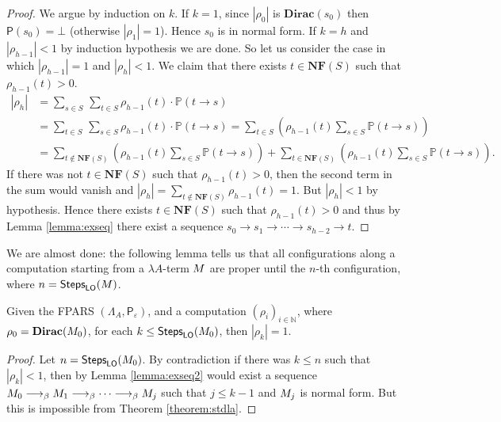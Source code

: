 \begin{proof}
	We argue by induction on $k$. If $k=1$, since $|\rho_0|$ is $\mathbf{Dirac}(s_0)$ then $\mathsf{P}(s_0)=\bot$ (otherwise $|\rho_1|=1$). Hence $s_0$ is in normal form. If $k=h$ and $|\rho_{h-1}|<1$ by induction hypothesis we are done. So let us consider the case in which $|\rho_{h-1}|=1$ and $|\rho_h|<1$. We claim that there exists $t\in \mathbf{NF}(S)$ such that $\rho_{h-1}(t)>0$.
	\begin{align*}
	|\rho_h|&=\underset{s\in S}{\sum}\,\underset{t\in S}{\sum}\rho_{h-1}(t) \cdot\mathbb{P}\left(t \rightarrow s\right)\\
	&=\underset{t\in S}{\sum}\,\underset{s\in S}{\sum}\rho_{h-1}(t) \cdot\mathbb{P}\left(t \rightarrow s\right)=\underset{t\in S}{\sum}\left(\rho_{h-1}(t)\underset{s\in S}{\sum}\mathbb{P}\left(t \rightarrow s\right) \right)\\
	&=\underset{t\not\in \mathbf{NF}(S)}{\sum}\left(\rho_{h-1}(t)\underset{s\in S}{\sum}\mathbb{P}\left(t \rightarrow s\right) \right)+\underset{t\in \mathbf{NF}(S)}{\sum}\left(\rho_{h-1}(t)\underset{s\in S}{\sum}\mathbb{P}\left(t \rightarrow s\right) \right).
	\end{align*}
	If there was not $t\in \mathbf{NF}(S)$ such that $\rho_{h-1}(t)>0$, then the second term in the sum would vanish and
	$|\rho_h|=\underset{t\not\in \mathbf{NF}(S)}{\sum}\rho_{h-1}(t)=1$.
	But $|\rho_h|<1$ by hypothesis. Hence there exists $t\in \mathbf{NF}(S)$ such that $\rho_{h-1}(t)>0$ and thus by Lemma \ref{lemma:exseq} there exist a sequence $s_0\rightarrow s_1\rightarrow\cdots\rightarrow s_{h-2}\rightarrow t$.
\end{proof}
We are almost done: the following lemma tells us that all
configurations along a computation starting from a $\lambda A$-term $M$
are proper until the $n$-th configuration, where
$n=\textsf{Steps}_{\textsf{LO}}(M)$.
\begin{lemma}\label{lemma:min}
	Given the FPARS $(\Lambda_A, \mathsf{P_\varepsilon})$, and a
	computation $(\rho_i)_{i\in\mathbb{N}}$, where
	$\rho_0=\mathbf{Dirac}(M_0)$, for each
	$k\leq\textsf{Steps}_{\textsf{LO}}(M_0)$, then $|\rho_k|=1$.
\end{lemma}
\begin{proof}
	Let $n=\textsf{Steps}_{\textsf{LO}}(M_0)$. By contradiction if there was $k\leq n$ such that $|\rho_k|<1$, then by Lemma \ref{lemma:exseq2} would exist a sequence $M_0\longrightarrow_\beta M_1\longrightarrow_\beta\cdots\longrightarrow_\beta M_j$ such that $j\leq k-1$ and $M_j$ is normal form. But this is impossible from Theorem \ref{theorem:stdla}.
\end{proof}
